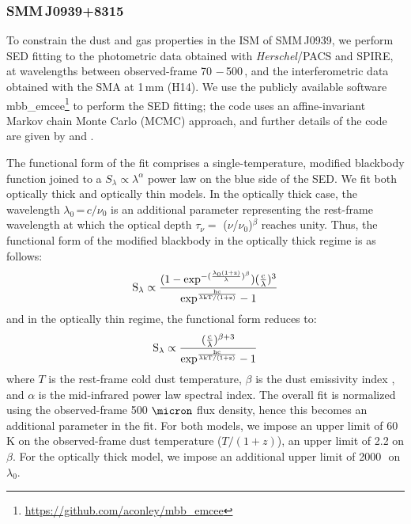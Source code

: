 \documentclass[twocolumn,apj,numberedappendix]{emulateapj}
\begin{document}
\subsubsection{SMM\,J0939+8315} \label{sec:SEDBg}
To constrain the dust and gas properties in the ISM of SMM\,J0939, we perform SED fitting to the
photometric data obtained with {\it Herschel}/PACS and SPIRE, at wavelengths
between observed-frame 70\,\micron\,$-$\,500\,\micron, and the interferometric data obtained with the SMA at 1\,mm (H14). We use the publicly
available software {\sc mbb\_emcee}\footnote{\url{https://github.com/aconley/mbb\_emcee}} to perform the SED fitting; the code uses an affine-invariant Markov chain Monte
Carlo (MCMC) approach, and further details of the code are given by \citet{Riechers13a} and \citet{Dowell14a}. \par
The
functional form of the fit comprises a single-temperature, modified blackbody function joined to a $S_{\lambda} \propto \lambda^\alpha
$ power law on the blue
side of the SED.
We fit both optically thick and optically thin models. In the optically thick case, the wavelength $
\lambda_0$\,=\,${c}/{\nu_0}$ is an additional parameter representing the rest-frame wavelength at which the optical
depth $\tau_{\nu} =$ ($\nu$/$\nu_0$)$^\beta$ reaches unity. Thus, the functional form of the modified blackbody
in the optically thick regime is as follows:
\begin{equation}
\rm S_{\lambda} \propto \frac{(1-exp^{-(\frac{\lambda_0 (1+z)}{\lambda})^{\beta}})(\frac{c}{\lambda})^3}
{exp^{\frac{hc}{\lambda\rm{kT/(1+z)} } }-1}
\end{equation}
and in the optically thin regime, the functional form reduces to:
\begin{equation}
\rm S_{\lambda} \propto \frac{(\frac{c}{\lambda})^{\beta+3}}{exp^{\frac{hc}{\lambda\rm{kT/(1+z)}}}-1}
\end{equation}
where $T$ is the rest-frame cold dust temperature, $\beta$ is the dust emissivity index 
, and $\alpha$ is the mid-infrared power law spectral index. The overall fit is normalized using the observed-frame 500
$\micron$ flux density, hence this becomes an additional parameter in the fit. For both models, we impose an upper limit of 60 K on the observed-frame dust temperature ($T/(1+z)$), an upper limit of 2.2 on
$\beta$. For the optically thick model, we impose an additional upper limit of 2000\,\micron\ on $\lambda_0$.
\end{document}

